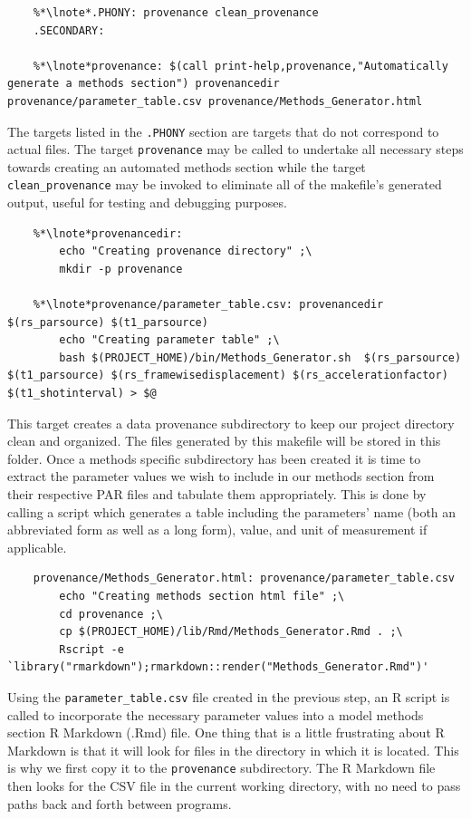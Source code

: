 \newpage

\begin{lstlisting}
	%*\lnote*.PHONY: provenance clean_provenance
	.SECONDARY:
	
	%*\lnote*provenance: $(call print-help,provenance,"Automatically generate a methods section") provenancedir provenance/parameter_table.csv provenance/Methods_Generator.html
\end{lstlisting}

 The targets listed in the \texttt{.PHONY} section are targets that do not correspond to actual files. The target  \texttt{provenance} may be called to undertake all necessary steps towards creating an automated methods section while the target \texttt{clean_provenance} may be invoked to eliminate all of the makefile's generated output, useful for testing and debugging purposes.

\begin{lstlisting}
	%*\lnote*provenancedir: 
		echo "Creating provenance directory" ;\
		mkdir -p provenance
		
	%*\lnote*provenance/parameter_table.csv: provenancedir $(rs_parsource) $(t1_parsource)
		echo "Creating parameter table" ;\
		bash $(PROJECT_HOME)/bin/Methods_Generator.sh  $(rs_parsource) $(t1_parsource) $(rs_framewisedisplacement) $(rs_accelerationfactor) $(t1_shotinterval) > $@
\end{lstlisting}

 This target creates a data provenance subdirectory to keep our project directory clean and organized. The files generated by this makefile will be stored in this folder.  Once a methods specific subdirectory has been created it is time to extract the parameter values we wish to include in our methods section from their respective PAR files and tabulate them appropriately. This is done by  calling a \bashn{} script which generates a table including the parameters' name (both an abbreviated form as well as a long form), value, and unit of measurement if applicable.

\begin{lstlisting}
	provenance/Methods_Generator.html: provenance/parameter_table.csv
		echo "Creating methods section html file" ;\
		cd provenance ;\
		cp $(PROJECT_HOME)/lib/Rmd/Methods_Generator.Rmd . ;\
		Rscript -e `library("rmarkdown");rmarkdown::render("Methods_Generator.Rmd")'
\end{lstlisting}

Using the \texttt{parameter_table.csv} file created in the previous step,  an R script is called to incorporate the necessary parameter values into a model methods section R Markdown (.Rmd) file. One thing that is a little frustrating about R Markdown is that it will look for files in the directory in which it is located. This is why we first copy it to the \texttt{provenance} subdirectory. The R Markdown file then looks for the CSV file in the current working directory, with no need to pass paths back and forth between programs. 

